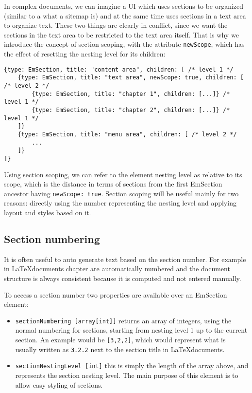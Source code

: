 In complex documents, we can imagine a UI which uses sections to be organized (similar to a what a sitemap is) and at the same time uses sections in a text area to organize text. These two things are clearly in conflict, since we want the sections in the text area to be restricted to the text area itself. That is why we introduce the concept of section scoping, with the attribute \texttt{newScope}, which has the effect of resetting the nesting level for its children:

\begin{verbatim}
{type: EmSection, title: "content area", children: [ /* level 1 */
    {type: EmSection, title: "text area", newScope: true, children: [ /* level 2 */
        {type: EmSection, title: "chapter 1", children: [...]} /* level 1 */
        {type: EmSection, title: "chapter 2", children: [...]} /* level 1 */
    ]}
    {type: EmSection, title: "menu area", children: [ /* level 2 */
        ...
    ]}
]}

\end{verbatim}

Using section scoping, we can refer to the element nesting level as relative to its scope, which is the distance in terms of sections from the first EmSection ancestor having \texttt{newScope: true}. Section scoping will be useful mainly for two reasons: directly using the number representing the nesting level and applying layout and styles based on it.

\subsection{Section numbering}

It is often useful to auto generate text based on the section number. For example in \LaTeX  documents chapter are automatically numbered and the document structure is always consistent because it is computed and not entered manually.

To access a section number two properties are available over an EmSection element:
\begin{itemize}
    \item \texttt{sectionNumbering [array[int]]} returns an array of integers, using the normal numbering for sections, starting from nesting level 1 up to the current section. An example would be \texttt{[3,2,2]}, which would represent what is usually written as \texttt{3.2.2} next to the section title in \LaTeX documents.
    \item \texttt{sectionNestingLevel [int]} this is simply the length of the array above, and represents the section nesting level. The main purpose of this element is to allow easy styling of sections.
\end{itemize}

